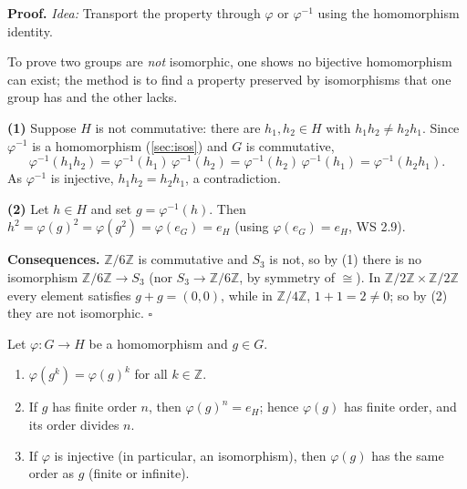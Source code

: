 \documentclass[11pt]{report}
\renewenvironment{proof}[1][Proof]{\noindent\textbf{#1.} }{\hfill$\square$\par\vspace{5pt}}
\begin{document}
\begin{proof}
\textit{Idea:} Transport the property through $\varphi$ or $\varphi^{-1}$ using the homomorphism identity.\par
To prove two groups are \emph{not} isomorphic, one shows no bijective homomorphism can exist; the method is to find a property preserved by isomorphisms that one group has and the other lacks.

\textbf{(1)} Suppose $H$ is not commutative: there are $h_1, h_2 \in H$ with $h_1 h_2 \neq h_2 h_1$. Since $\varphi^{-1}$ is a homomorphism (\ref{sec:isos}) and $G$ is commutative,
\[ \varphi^{-1}(h_1 h_2) = \varphi^{-1}(h_1)\,\varphi^{-1}(h_2) = \varphi^{-1}(h_2)\,\varphi^{-1}(h_1) = \varphi^{-1}(h_2 h_1). \]
As $\varphi^{-1}$ is injective, $h_1 h_2 = h_2 h_1$, a contradiction.

\textbf{(2)} Let $h \in H$ and set $g = \varphi^{-1}(h)$. Then $h^2 = \varphi(g)^2 = \varphi(g^2) = \varphi(e_G) = e_H$ (using $\varphi(e_G) = e_H$, WS 2.9).

\textbf{Consequences.} $\mathbb{Z}/6\mathbb{Z}$ is commutative and $S_3$ is not, so by (1) there is no isomorphism $\mathbb{Z}/6\mathbb{Z} \to S_3$ (nor $S_3 \to \mathbb{Z}/6\mathbb{Z}$, by symmetry of $\cong$). In $\mathbb{Z}/2\mathbb{Z} \times \mathbb{Z}/2\mathbb{Z}$ every element satisfies $g + g = (0, 0)$, while in $\mathbb{Z}/4\mathbb{Z}$, $1 + 1 = 2 \neq 0$; so by (2) they are not isomorphic.
\end{proof}

\begin{propbox}\label{prop:homomorphisms-orders-elements}
Let $\varphi: G \to H$ be a homomorphism and $g \in G$.
\begin{enumerate}
    \item $\varphi(g^k) = \varphi(g)^k$ for all $k \in \mathbb{Z}$.
    \item If $g$ has finite order $n$, then $\varphi(g)^n = e_H$; hence $\varphi(g)$ has finite order, and its order divides $n$.
    \item If $\varphi$ is injective (in particular, an isomorphism), then $\varphi(g)$ has the same order as $g$ (finite or infinite).
\end{enumerate}
\end{propbox}
\end{document}

